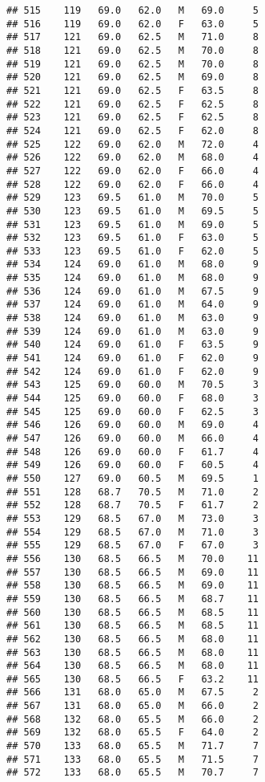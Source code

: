 \documentclass[
]{article}
\begin{document}
\begin{verbatim}
## 515    119   69.0   62.0   M   69.0     5
## 516    119   69.0   62.0   F   63.0     5
## 517    121   69.0   62.5   M   71.0     8
## 518    121   69.0   62.5   M   70.0     8
## 519    121   69.0   62.5   M   70.0     8
## 520    121   69.0   62.5   M   69.0     8
## 521    121   69.0   62.5   F   63.5     8
## 522    121   69.0   62.5   F   62.5     8
## 523    121   69.0   62.5   F   62.5     8
## 524    121   69.0   62.5   F   62.0     8
## 525    122   69.0   62.0   M   72.0     4
## 526    122   69.0   62.0   M   68.0     4
## 527    122   69.0   62.0   F   66.0     4
## 528    122   69.0   62.0   F   66.0     4
## 529    123   69.5   61.0   M   70.0     5
## 530    123   69.5   61.0   M   69.5     5
## 531    123   69.5   61.0   M   69.0     5
## 532    123   69.5   61.0   F   63.0     5
## 533    123   69.5   61.0   F   62.0     5
## 534    124   69.0   61.0   M   68.0     9
## 535    124   69.0   61.0   M   68.0     9
## 536    124   69.0   61.0   M   67.5     9
## 537    124   69.0   61.0   M   64.0     9
## 538    124   69.0   61.0   M   63.0     9
## 539    124   69.0   61.0   M   63.0     9
## 540    124   69.0   61.0   F   63.5     9
## 541    124   69.0   61.0   F   62.0     9
## 542    124   69.0   61.0   F   62.0     9
## 543    125   69.0   60.0   M   70.5     3
## 544    125   69.0   60.0   F   68.0     3
## 545    125   69.0   60.0   F   62.5     3
## 546    126   69.0   60.0   M   69.0     4
## 547    126   69.0   60.0   M   66.0     4
## 548    126   69.0   60.0   F   61.7     4
## 549    126   69.0   60.0   F   60.5     4
## 550    127   69.0   60.5   M   69.5     1
## 551    128   68.7   70.5   M   71.0     2
## 552    128   68.7   70.5   F   61.7     2
## 553    129   68.5   67.0   M   73.0     3
## 554    129   68.5   67.0   M   71.0     3
## 555    129   68.5   67.0   F   67.0     3
## 556    130   68.5   66.5   M   70.0    11
## 557    130   68.5   66.5   M   69.0    11
## 558    130   68.5   66.5   M   69.0    11
## 559    130   68.5   66.5   M   68.7    11
## 560    130   68.5   66.5   M   68.5    11
## 561    130   68.5   66.5   M   68.5    11
## 562    130   68.5   66.5   M   68.0    11
## 563    130   68.5   66.5   M   68.0    11
## 564    130   68.5   66.5   M   68.0    11
## 565    130   68.5   66.5   F   63.2    11
## 566    131   68.0   65.0   M   67.5     2
## 567    131   68.0   65.0   M   66.0     2
## 568    132   68.0   65.5   M   66.0     2
## 569    132   68.0   65.5   F   64.0     2
## 570    133   68.0   65.5   M   71.7     7
## 571    133   68.0   65.5   M   71.5     7
## 572    133   68.0   65.5   M   70.7     7

\end{verbatim}
\end{document}
